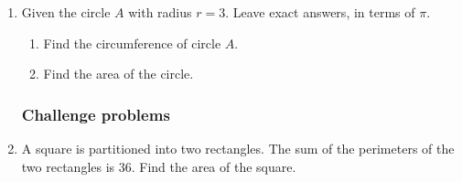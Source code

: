 \begin{enumerate}
\item Given the circle $A$ with radius $r=3$. Leave exact answers, in terms of $\pi$.
  \begin{multicols}{2}
    \begin{enumerate}
      \item Find the circumference of circle $A$. \vspace{1cm}
      \item Find the area of the circle.\vspace{2cm}
    \end{enumerate}
    \begin{flushright}
  \end{flushright}
  \end{multicols}

\newpage    
\subsubsection*{Challenge problems}
\item A square is partitioned into two rectangles. The sum of the perimeters of the two rectangles is 36. Find the area of the square.
\begin{flushright}
\end{flushright}


\end{enumerate}
